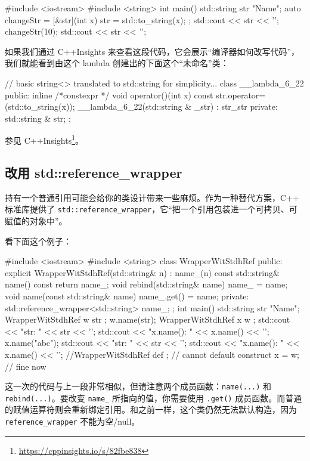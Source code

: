 \begin{codebox}[cpp]
#include <iostream>
#include <string>
int main() {
std::string str { "Name"};
auto changeStr = [&str](int x) {
str = std::to_string(x);
};
std::cout << str << '\n';
changeStr(10);
std::cout << str << '\n';
}
\end{codebox}

如果我们通过 C++Insights 来查看这段代码，它会展示“编译器如何改写代码”，我们就能看到由这个 lambda 创建出的下面这个“未命名”类：

\begin{codebox}[cpp]
// basic string<> translated to std::string for simplicity...
class __lambda_6_22 {
public:
inline /*constexpr */ void operator()(int x) const {
str.operator=(std::to_string(x));
}
__lambda_6_22(std::string & _str) : str{_str} { }
private:
std::string & str;
};
\end{codebox}

参见 C++Insights\footnote{\url{https://cppinsights.io/s/82fbe838}}。

\subsection{改用 std::reference\_wrapper}

持有一个普通引用可能会给你的类设计带来一些麻烦。作为一种替代方案，C++ 标准库提供了 \texttt{std::reference\_wrapper}，它“把一个引用包装进一个可拷贝、可赋值的对象中”。

看下面这个例子：

\begin{codebox}[cpp]
#include <iostream>
#include <string>
class WrapperWitStdhRef {
public:
explicit WrapperWitStdhRef(std::string& n) : name_(n) { }
const std::string& name() const { return name_; }
void rebind(std::string& name) { name_ = name; }
void name(const std::string& name) { name_.get() = name; }
private:
std::reference_wrapper<std::string> name_;
};
int main() {
std::string str { "Name"};
WrapperWitStdhRef w { str };
w.name(str);
WrapperWitStdhRef x { w };
std::cout << "str:
" << str << '\n';
std::cout << "x.name(): " << x.name() << '\n';
x.name("abc");
std::cout << "str:
" << str << '\n';
std::cout << "x.name(): " << x.name() << '\n';
//WrapperWitStdhRef def {}; // cannot default construct
x = w; // fine now
}
\end{codebox}

这一次的代码与上一段非常相似，但请注意两个成员函数：\texttt{name(...)} 和 \texttt{rebind(...)}。要改变 \texttt{name\_} 所指向的值，你需要使用 \texttt{.get()} 成员函数。而普通的赋值运算符则会重新绑定引用。和之前一样，这个类仍然无法默认构造，因为 \texttt{reference\_wrapper} 不能为空/null。

